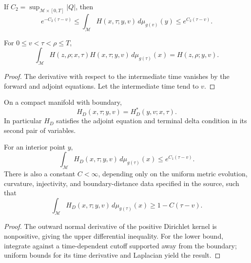 \begin{lemma}
\label{lem:chow-iii-closed-heat-kernel-second-mass-bound}


If \(C_2=\sup_{\mathcal M\times[0,T]}|Q|\), then
\[
 e^{-C_2(\tau-v)}\le
 \int_{\mathcal M}H(x,\tau;y,v)\,d\mu_{g(v)}(y)
 \le e^{C_2(\tau-v)}.
\]
\end{lemma}

\begin{lemma}
\label{lem:chow-iii-closed-heat-kernel-semigroup}


For \(0\le v<\tau<\rho\le T\),
\[
 \int_{\mathcal M}H(z,\rho;x,\tau)H(x,\tau;y,v)
 \,d\mu_{g(\tau)}(x)=H(z,\rho;y,v).
\]
\end{lemma}
\begin{proof}
\sketch The derivative with respect to the intermediate time vanishes by the forward
and adjoint equations.  Let the intermediate time tend to \(v\).
\end{proof}

\begin{lemma}
\label{lem:chow-iii-dirichlet-heat-adjoint-symmetry}


On a compact manifold with boundary,
\[
 H_D(x,\tau;y,v)=H_D^*(y,v;x,\tau).
\]
In particular \(H_D\) satisfies the adjoint equation and terminal delta
condition in its second pair of variables.
\end{lemma}

\begin{lemma}
\label{lem:chow-iii-dirichlet-heat-kernel-mass-bounds}


For an interior point \(y\),
\[
 \int_{\mathcal M}H_D(x,\tau;y,v)\,d\mu_{g(\tau)}(x)
 \le e^{C_1(\tau-v)}.
\]
There is also a constant \(C<\infty\), depending only on the uniform metric
evolution, curvature, injectivity, and boundary-distance data specified in
the source, such that
\[
 \int_{\mathcal M}H_D(x,\tau;y,v)\,d\mu_{g(\tau)}(x)
 \ge 1-C(\tau-v).
\]
\end{lemma}
\begin{proof}
\sketch The outward normal derivative of the positive Dirichlet kernel is
nonpositive, giving the upper differential inequality.  For the lower bound,
integrate against a time-dependent cutoff supported away from the boundary;
uniform bounds for its time derivative and Laplacian yield the result.
\end{proof}

